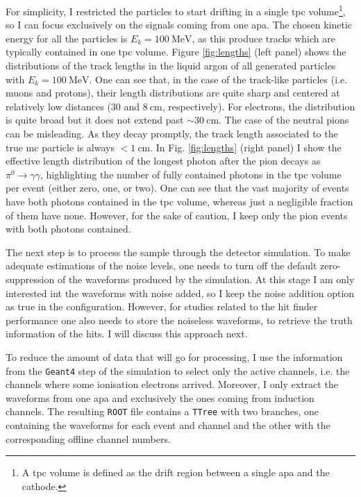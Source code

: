 For simplicity, I restricted the particles to start drifting in a single \gls{tpc} volume\footnote{A \gls{tpc} volume is defined as the drift region between a single \gls{apa} and the cathode.}, so I can focus exclusively on the signals coming from one \gls{apa}. The chosen kinetic energy for all the particles is $E_{k} = 100 \ \mathrm{MeV}$, as this produce tracks which are typically contained in one \gls{tpc} volume. Figure \ref{fig:lengths} (left panel) shows the distributions of the track lengths in the liquid argon of all generated particles with $E_{k} = 100 \ \mathrm{MeV}$. One can see that, in the case of the track-like particles (i.e. muons and protons), their length distributions are quite sharp and centered at relatively low distances ($30$ and $8 \ \mathrm{cm}$, respectively). For electrons, the distribution is quite broad but it does not extend past $\sim 30 \ \mathrm{cm}$. The case of the neutral pions can be misleading. As they decay promptly, the track length associated to the true \gls{mc} particle is always $< 1 \ \mathrm{cm}$. In Fig. \ref{fig:lengths} (right panel) I show the effective length distribution of the longest photon after the pion decays as $\pi^{0} \rightarrow \gamma \gamma$, highlighting the number of fully contained photons in the \gls{tpc} volume per event (either zero, one, or two). One can see that the vast majority of events have both photons contained in the \gls{tpc} volume, whereas just a negligible fraction of them have none. However, for the sake of caution, I keep only the pion events with both photons contained.

The next step is to process the sample through the detector simulation. To make adequate estimations of the noise levels, one needs to turn off the default zero-suppression of the waveforms produced by the simulation. At this stage I am only interested int the waveforms with noise added, so I keep the noise addition option as true in the configuration. However, for studies related to the hit finder performance one also needs to store the noiseless waveforms, to retrieve the truth information of the hits. I will discuss this approach next.

To reduce the amount of data that will go for processing, I use the information from the \texttt{Geant4} step of the simulation to select only the active channels, i.e. the channels where some ionisation electrons arrived. Moreover, I only extract the waveforms from one \gls{apa} and exclusively the ones coming from induction channels. The resulting \texttt{ROOT} file contains a \texttt{TTree} with two branches, one containing the waveforms for each event and channel and the other with the corresponding offline channel numbers.

